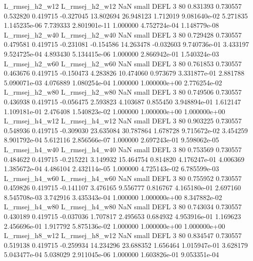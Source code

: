 L_rmsej_h2_w12 L_rmsej_h2_w12                   NaN      small     DEFL                 3 80 0.831393       0.730557 0.532820       0.419715   -0.327045     13.802694     26.948123     1.712019   9.081640e-02  5.271835 1.145235e-06     7.739333   2.801901e-11            1.000000    4.752724e-04        1.148779e-08
L_rmsej_h2_w40 L_rmsej_h2_w40                   NaN      small     DEFL                 3 80 0.729428       0.730557 0.479581       0.419715   -0.231081     -0.154586     14.263478    -0.032603   9.740736e-01  3.433197 9.524725e-04     4.893430   5.134415e-06            1.000000    2.866942e-01        1.540324e-03
L_rmsej_h2_w60 L_rmsej_h2_w60                   NaN      small     DEFL                 3 80 0.761853       0.730557 0.463676       0.419715   -0.150473      4.283826     10.474060     0.973679   3.331877e-01  2.881788 5.090071e-03     4.076889   1.080254e-04            1.000000    1.000000e+00        2.776254e-02
L_rmsej_h2_w80 L_rmsej_h2_w80                   NaN      small     DEFL                 3 80 0.749506       0.730557 0.436938       0.419715   -0.056475      2.593823      4.103687     0.855450   3.948894e-01  1.612147 1.109181e-01     2.476408   1.540823e-02            1.000000    1.000000e+00        1.000000e+00
L_rmsej_h4_w12 L_rmsej_h4_w12                   NaN      small     DEFL                 3 80 0.903225       0.730557 0.548936       0.419715   -0.309030     23.635084     30.787864     1.678728   9.715672e-02  3.454259 8.901792e-04     5.612116   2.856566e-07            1.000000    2.697243e-01        9.598062e-05
L_rmsej_h4_w40 L_rmsej_h4_w40                   NaN      small     DEFL                 3 80 0.753569       0.730557 0.484622       0.419715   -0.215221      3.149932     15.464754     0.814820   4.176247e-01  4.006369 1.385672e-04     4.486104   2.432114e-05            1.000000    4.725143e-02        6.785599e-03
L_rmsej_h4_w60 L_rmsej_h4_w60                   NaN      small     DEFL                 3 80 0.755952       0.730557 0.459826       0.419715   -0.141107      3.476165      9.556777     0.816767   4.165180e-01  2.697160 8.545708e-03     3.742916   3.435343e-04            1.000000    1.000000e+00        8.347882e-02
L_rmsej_h4_w80 L_rmsej_h4_w80                   NaN      small     DEFL                 3 80 0.743034       0.730557 0.430189       0.419715   -0.037036      1.707817      2.495653     0.684932   4.953916e-01  1.169623 2.456696e-01     1.917792   5.875136e-02            1.000000    1.000000e+00        1.000000e+00
L_rmsej_h8_w12 L_rmsej_h8_w12                   NaN      small     DEFL                 3 80 0.834547       0.730557 0.519138       0.419715   -0.259934     14.234296     23.688352     1.656464   1.015947e-01  3.628179 5.043477e-04     5.038029   2.911045e-06            1.000000    1.603826e-01        9.053351e-04
